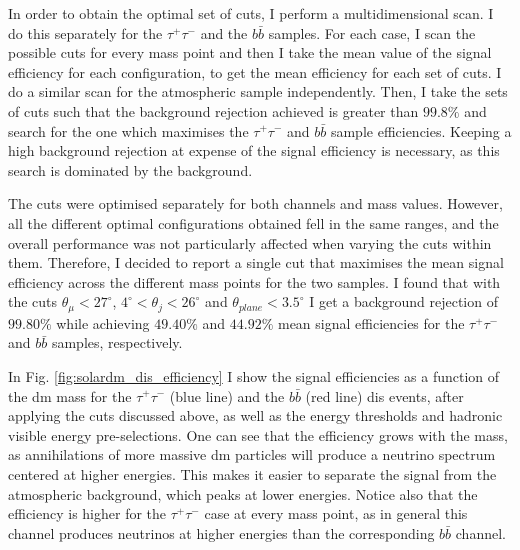 In order to obtain the optimal set of cuts, I perform a multidimensional scan. I do this separately for the $\tau^{+} \tau^{-}$ and the $b\bar{b}$ samples. For each case, I scan the possible cuts for every mass point and then I take the mean value of the signal efficiency for each configuration, to get the mean efficiency for each set of cuts. I do a similar scan for the atmospheric sample independently. Then, I take the sets of cuts such that the background rejection achieved is greater than $99.8\%$ and search for the one which maximises the $\tau^{+} \tau^{-}$ and $b\bar{b}$ sample efficiencies. Keeping a high background rejection at expense of the signal efficiency is necessary, as this search is dominated by the background.

The cuts were optimised separately for both channels and mass values. However, all the different optimal configurations obtained fell in the same ranges, and the overall performance was not particularly affected when varying the cuts within them. Therefore, I decided to report a single cut that maximises the mean signal efficiency across the different mass points for the two samples. I found that with the cuts $\theta_{\mu} < 27^{\circ}$, $4^{\circ} < \theta_{j} < 26^{\circ}$ and $\theta_{plane} < 3.5^{\circ}$ I get a background rejection of $99.80\%$ while achieving $49.40\%$ and $44.92\%$ mean signal efficiencies for the $\tau^{+} \tau^{-}$ and $b\bar{b}$ samples, respectively.

In Fig. \ref{fig:solardm_dis_efficiency} I show the signal efficiencies as a function of the \gls{dm} mass for the $\tau^{+} \tau^{-}$ (blue line) and the $b\bar{b}$ (red line) \gls{dis} events, after applying the cuts discussed above, as well as the energy thresholds and hadronic visible energy pre-selections. One can see that the efficiency grows with the mass, as annihilations of more massive \gls{dm} particles will produce a neutrino spectrum centered at higher energies. This makes it easier to separate the signal from the atmospheric background, which peaks at lower energies. Notice also that the efficiency is higher for the $\tau^{+} \tau^{-}$ case at every mass point, as in general this channel produces neutrinos at higher energies than the corresponding $b\bar{b}$ channel.

